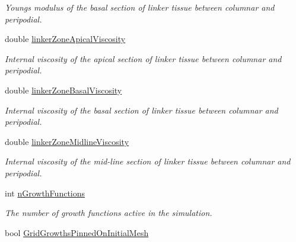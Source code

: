 \begin{DoxyCompactItemize}
\begin{DoxyCompactList}\small\item\em Young\textquotesingle{}s modulus of the basal section of linker tissue between columnar and peripodial. \end{DoxyCompactList}\item 
\hypertarget{classSimulation_a8f11d2644c957402cd0e6e1b4c652182}{}double \hyperlink{classSimulation_a8f11d2644c957402cd0e6e1b4c652182}{linker\+Zone\+Apical\+Viscosity}\label{classSimulation_a8f11d2644c957402cd0e6e1b4c652182}

\begin{DoxyCompactList}\small\item\em Internal viscosity of the apical section of linker tissue between columnar and peripodial. \end{DoxyCompactList}\item 
\hypertarget{classSimulation_af7b9b2275582a0d94b6ac6709b0f73eb}{}double \hyperlink{classSimulation_af7b9b2275582a0d94b6ac6709b0f73eb}{linker\+Zone\+Basal\+Viscosity}\label{classSimulation_af7b9b2275582a0d94b6ac6709b0f73eb}

\begin{DoxyCompactList}\small\item\em Internal viscosity of the basal section of linker tissue between columnar and peripodial. \end{DoxyCompactList}\item 
\hypertarget{classSimulation_a5810bcef5e865af1cdbfb8e0586fa12d}{}double \hyperlink{classSimulation_a5810bcef5e865af1cdbfb8e0586fa12d}{linker\+Zone\+Midline\+Viscosity}\label{classSimulation_a5810bcef5e865af1cdbfb8e0586fa12d}

\begin{DoxyCompactList}\small\item\em Internal viscosity of the mid-\/line section of linker tissue between columnar and peripodial. \end{DoxyCompactList}\item 
\hypertarget{classSimulation_a47187b5d7f450b1c41e6fdaffeedc207}{}int \hyperlink{classSimulation_a47187b5d7f450b1c41e6fdaffeedc207}{n\+Growth\+Functions}\label{classSimulation_a47187b5d7f450b1c41e6fdaffeedc207}

\begin{DoxyCompactList}\small\item\em The number of growth functions active in the simulation. \end{DoxyCompactList}\item 
\hypertarget{classSimulation_ae83cadb5675d5ef391adb5d1595070ec}{}bool \hyperlink{classSimulation_ae83cadb5675d5ef391adb5d1595070ec}{Grid\+Growths\+Pinned\+On\+Initial\+Mesh}\label{classSimulation_ae83cadb5675d5ef391adb5d1595070ec}


\end{DoxyCompactItemize}
